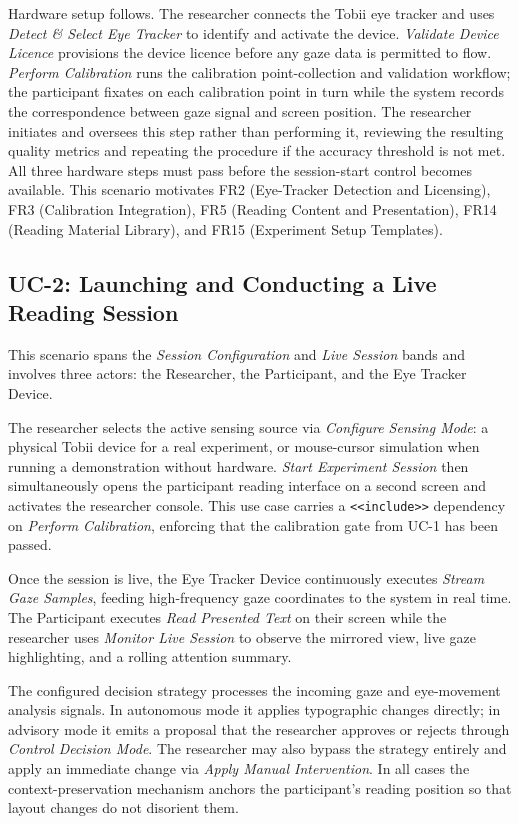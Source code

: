 Hardware setup follows.
The researcher connects the Tobii eye tracker and uses \textit{Detect \& Select
Eye Tracker} to identify and activate the device.
\textit{Validate Device Licence} provisions the device licence before any gaze data
is permitted to flow.
\textit{Perform Calibration} runs the calibration point-collection and validation
workflow; the participant fixates on each calibration point in turn while the
system records the correspondence between gaze signal and screen position.
The researcher initiates and oversees this step rather than performing it,
reviewing the resulting quality metrics and repeating the procedure if the
accuracy threshold is not met.
All three hardware steps must pass before the session-start control becomes
available.
This scenario motivates FR2 (Eye-Tracker Detection and Licensing), FR3 (Calibration Integration), FR5 (Reading Content and Presentation), FR14 (Reading Material Library), and FR15 (Experiment Setup Templates).

\subsection{UC-2: Launching and Conducting a Live Reading Session}
\label{sec:uc2}

This scenario spans the \textit{Session Configuration} and \textit{Live Session}
bands and involves three actors: the Researcher, the Participant, and the Eye
Tracker Device.

The researcher selects the active sensing source via \textit{Configure Sensing
Mode}: a physical Tobii device for a real experiment, or mouse-cursor simulation
when running a demonstration without hardware.
\textit{Start Experiment Session} then simultaneously opens the participant
reading interface on a second screen and activates the researcher console.
This use case carries a \texttt{<<include>>} dependency on \textit{Perform
Calibration}, enforcing that the calibration gate from UC-1 has been passed.

Once the session is live, the Eye Tracker Device continuously executes
\textit{Stream Gaze Samples}, feeding high-frequency gaze coordinates to the
system in real time.
The Participant executes \textit{Read Presented Text} on their screen while the
researcher uses \textit{Monitor Live Session} to observe the mirrored view,
live gaze highlighting, and a rolling attention summary.

The configured decision strategy processes the incoming gaze and eye-movement
analysis signals.
In autonomous mode it applies typographic changes directly; in advisory mode it
emits a proposal that the researcher approves or rejects through \textit{Control
Decision Mode}.
The researcher may also bypass the strategy entirely and apply an immediate change
via \textit{Apply Manual Intervention}.
In all cases the context-preservation mechanism anchors the participant's reading
position so that layout changes do not disorient them.

